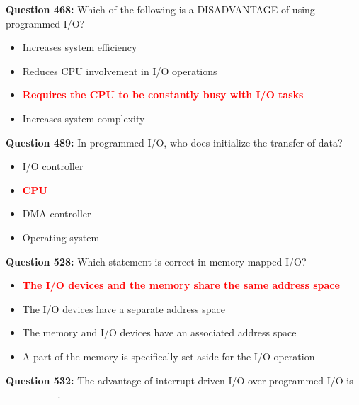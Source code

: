 \documentclass[12pt,a4paper]{article}
\begin{document}
\vspace{0.5cm}

\textbf{Question 468:} Which of the following is a DISADVANTAGE of using programmed I/O?

\begin{itemize}
    \item[\textbf{A.}] Increases system efficiency
    \item[\textbf{B.}] Reduces CPU involvement in I/O operations
    \item[\textbf{C.}] \textcolor{red}{\textbf{Requires the CPU to be constantly busy with I/O tasks}}
    \item[\textbf{D.}] Increases system complexity
\end{itemize}

\vspace{0.5cm}

\textbf{Question 489:} In programmed I/O, who does initialize the transfer of data?

\begin{itemize}
    \item[\textbf{A.}] I/O controller
    \item[\textbf{B.}] \textcolor{red}{\textbf{CPU}}
    \item[\textbf{C.}] DMA controller
    \item[\textbf{D.}] Operating system
\end{itemize}

\vspace{0.5cm}

\textbf{Question 528:} Which statement is correct in memory-mapped I/O?

\begin{itemize}
    \item[\textbf{A.}] \textcolor{red}{\textbf{The I/O devices and the memory share the same address space}}
    \item[\textbf{B.}] The I/O devices have a separate address space
    \item[\textbf{C.}] The memory and I/O devices have an associated address space
    \item[\textbf{D.}] A part of the memory is specifically set aside for the I/O operation
\end{itemize}

\vspace{0.5cm}

\textbf{Question 532:} The advantage of interrupt driven I/O over programmed I/O is _______.
\end{document}
